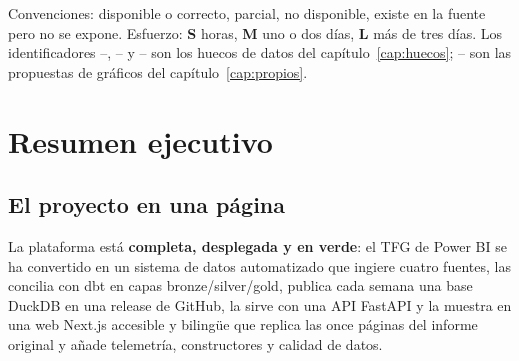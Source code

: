 \documentclass[11pt,openany]{report}
\begin{document}
\noindent Convenciones: \si{} disponible o correcto, \parcial{} parcial, \no{} no disponible,
\nada{} existe en la fuente pero no se expone. Esfuerzo: \textbf{S} horas, \textbf{M} uno o dos
días, \textbf{L} más de tres días. Los identificadores –, – y
– son los huecos de datos del capítulo~\ref{cap:huecos}; – son
las propuestas de gráficos del capítulo~\ref{cap:propios}.

\chapter{Resumen ejecutivo}\label{cap:resumen}

\section{El proyecto en una página}

La plataforma está \textbf{completa, desplegada y en verde}: el TFG de Power BI se ha convertido en
un sistema de datos automatizado que ingiere cuatro fuentes, las concilia con dbt en capas
bronze/silver/gold, publica cada semana una base DuckDB en una release de GitHub, la sirve con una
API FastAPI y la muestra en una web Next.js accesible y bilingüe que replica las once páginas del
informe original y añade telemetría, constructores y calidad de datos.
\end{document}
